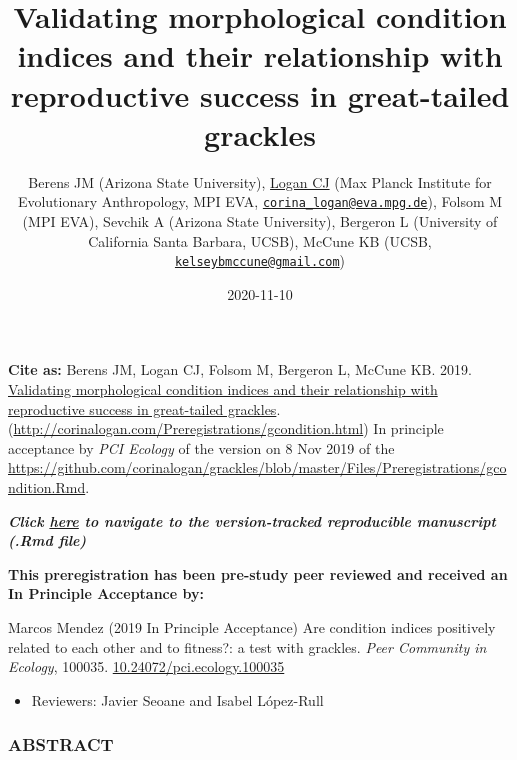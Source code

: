 \documentclass[
]{article}
\title{Validating morphological condition indices and their relationship with
reproductive success in great-tailed grackles}
\author{Berens JM (Arizona State University),
\href{http://CorinaLogan.com}{Logan CJ} (Max Planck Institute for
Evolutionary Anthropology, MPI EVA,
\href{mailto:corina_logan@eva.mpg.de}{\nolinkurl{corina\_logan@eva.mpg.de}}),
Folsom M (MPI EVA), Sevchik A (Arizona State University), Bergeron L
(University of California Santa Barbara, UCSB), McCune KB (UCSB,
\href{mailto:kelseybmccune@gmail.com}{\nolinkurl{kelseybmccune@gmail.com}})}
\date{2020-11-10}
\newenvironment{Shaded}{\begin{snugshade}}{\end{snugshade}}
\newcommand{\CommentTok}[1]{\textcolor[rgb]{0.56,0.35,0.01}{\textit{#1}}}
\newcommand{\DataTypeTok}[1]{\textcolor[rgb]{0.13,0.29,0.53}{#1}}
\newcommand{\DecValTok}[1]{\textcolor[rgb]{0.00,0.00,0.81}{#1}}
\newcommand{\KeywordTok}[1]{\textcolor[rgb]{0.13,0.29,0.53}{\textbf{#1}}}
\newcommand{\NormalTok}[1]{#1}
\newcommand{\OperatorTok}[1]{\textcolor[rgb]{0.81,0.36,0.00}{\textbf{#1}}}
\newcommand{\OtherTok}[1]{\textcolor[rgb]{0.56,0.35,0.01}{#1}}
\providecommand{\tightlist}{%
  \setlength{\itemsep}{0pt}\setlength{\parskip}{0pt}}
\begin{document}
\maketitle

\begin{Shaded}
\end{Shaded}

\textbf{Cite as:} Berens JM, Logan CJ, Folsom M, Bergeron L, McCune KB.
2019.
\href{http://corinalogan.com/Preregistrations/gcondition.html}{Validating
morphological condition indices and their relationship with reproductive
success in great-tailed grackles}.
(\url{http://corinalogan.com/Preregistrations/gcondition.html}) In
principle acceptance by \emph{PCI Ecology} of the version on 8 Nov 2019
of the
\url{https://github.com/corinalogan/grackles/blob/master/Files/Preregistrations/gcondition.Rmd}.

\textbf{\emph{Click
\href{https://github.com/corinalogan/grackles/blob/master/README.md}{here}
to navigate to the version-tracked reproducible manuscript (.Rmd file)}}

\textbf{This preregistration has been pre-study peer reviewed and
received an In Principle Acceptance by:}

Marcos Mendez (2019 In Principle Acceptance) Are condition indices
positively related to each other and to fitness?: a test with grackles.
\emph{Peer Community in Ecology}, 100035.
\href{https://doi.org/10.24072/pci.ecology.100035}{10.24072/pci.ecology.100035}

\begin{itemize}
\tightlist
\item
  Reviewers: Javier Seoane and Isabel López-Rull
\end{itemize}

\hypertarget{abstract}{%
\subsubsection{ABSTRACT}\label{abstract}}
\end{document}
